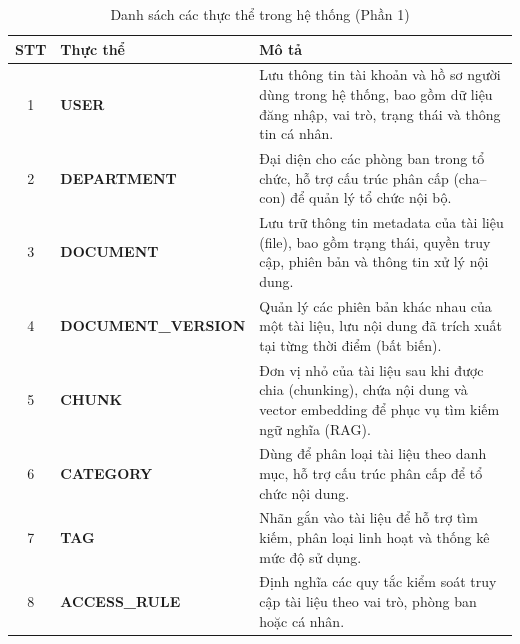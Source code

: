 \documentclass[12pt,a4paper]{report}
\begin{document}
\begin{table}[H]
\centering
\small
\caption{Danh sách các thực thể trong hệ thống (Phần 1)}
\label{tab:entities_part1}
\begin{tabularx}{\textwidth}{|c|l|X|}
\hline
\rowcolor{gray!10}
STT & Thực thể & Mô tả \\ \hline
1 & \textbf{USER} & Lưu thông tin tài khoản và hồ sơ người dùng trong hệ thống, bao gồm dữ liệu đăng nhập, vai trò, trạng thái và thông tin cá nhân. \\ \hline
2 & \textbf{DEPARTMENT} & Đại diện cho các phòng ban trong tổ chức, hỗ trợ cấu trúc phân cấp (cha–con) để quản lý tổ chức nội bộ. \\ \hline
3 & \textbf{DOCUMENT} & Lưu trữ thông tin metadata của tài liệu (file), bao gồm trạng thái, quyền truy cập, phiên bản và thông tin xử lý nội dung. \\ \hline
4 & \textbf{DOCUMENT\_VERSION} & Quản lý các phiên bản khác nhau của một tài liệu, lưu nội dung đã trích xuất tại từng thời điểm (bất biến). \\ \hline
5 & \textbf{CHUNK} & Đơn vị nhỏ của tài liệu sau khi được chia (chunking), chứa nội dung và vector embedding để phục vụ tìm kiếm ngữ nghĩa (RAG). \\ \hline
6 & \textbf{CATEGORY} & Dùng để phân loại tài liệu theo danh mục, hỗ trợ cấu trúc phân cấp để tổ chức nội dung. \\ \hline
7 & \textbf{TAG} & Nhãn gắn vào tài liệu để hỗ trợ tìm kiếm, phân loại linh hoạt và thống kê mức độ sử dụng. \\ \hline
8 & \textbf{ACCESS\_RULE} & Định nghĩa các quy tắc kiểm soát truy cập tài liệu theo vai trò, phòng ban hoặc cá nhân. \\ \hline
\end{tabularx}
\end{table}
\end{document}
